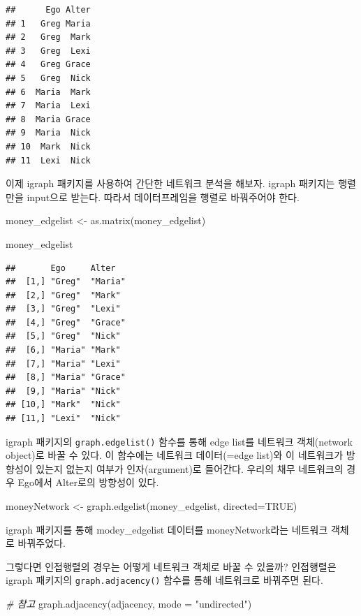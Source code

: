 \documentclass[
]{book}
\newenvironment{Shaded}{\begin{snugshade}}{\end{snugshade}}
\newcommand{\AttributeTok}[1]{\textcolor[rgb]{0.77,0.63,0.00}{#1}}
\newcommand{\CommentTok}[1]{\textcolor[rgb]{0.56,0.35,0.01}{\textit{#1}}}
\newcommand{\ConstantTok}[1]{\textcolor[rgb]{0.00,0.00,0.00}{#1}}
\newcommand{\FunctionTok}[1]{\textcolor[rgb]{0.00,0.00,0.00}{#1}}
\newcommand{\NormalTok}[1]{#1}
\newcommand{\OtherTok}[1]{\textcolor[rgb]{0.56,0.35,0.01}{#1}}
\newcommand{\StringTok}[1]{\textcolor[rgb]{0.31,0.60,0.02}{#1}}
\begin{document}
\begin{verbatim}
##      Ego Alter
## 1   Greg Maria
## 2   Greg  Mark
## 3   Greg  Lexi
## 4   Greg Grace
## 5   Greg  Nick
## 6  Maria  Mark
## 7  Maria  Lexi
## 8  Maria Grace
## 9  Maria  Nick
## 10  Mark  Nick
## 11  Lexi  Nick
\end{verbatim}

이제 igraph 패키지를 사용하여 간단한 네트워크 분석을 해보자. igraph 패키지는 행렬만을 input으로 받는다. 따라서 데이터프레임을 행렬로 바꿔주어야 한다.

\begin{Shaded}
\begin{Highlighting}[]
\NormalTok{money\_edgelist }\OtherTok{\textless{}{-}} \FunctionTok{as.matrix}\NormalTok{(money\_edgelist)}

\NormalTok{money\_edgelist}
\end{Highlighting}
\end{Shaded}

\begin{verbatim}
##       Ego     Alter  
##  [1,] "Greg"  "Maria"
##  [2,] "Greg"  "Mark" 
##  [3,] "Greg"  "Lexi" 
##  [4,] "Greg"  "Grace"
##  [5,] "Greg"  "Nick" 
##  [6,] "Maria" "Mark" 
##  [7,] "Maria" "Lexi" 
##  [8,] "Maria" "Grace"
##  [9,] "Maria" "Nick" 
## [10,] "Mark"  "Nick" 
## [11,] "Lexi"  "Nick"
\end{verbatim}

igraph 패키지의 \texttt{graph.edgelist()} 함수를 통해 edge list를 네트워크 객체(network object)로 바꿀 수 있다. 이 함수에는 네트워크 데이터(=edge list)와 이 네트워크가 방향성이 있는지 없는지 여부가 인자(argument)로 들어간다. 우리의 채무 네트워크의 경우 Ego에서 Alter로의 방향성이 있다.

\begin{Shaded}
\begin{Highlighting}[]
\NormalTok{  moneyNetwork }\OtherTok{\textless{}{-}} \FunctionTok{graph.edgelist}\NormalTok{(money\_edgelist, }\AttributeTok{directed=}\ConstantTok{TRUE}\NormalTok{)}
\end{Highlighting}
\end{Shaded}

igraph 패키지를 통해 modey\_edgelist 데이터를 moneyNetwork라는 네트워크 객체로 바꿔주었다.

그렇다면 인접행렬의 경우는 어떻게 네트워크 객체로 바꿀 수 있을까? 인접행렬은 igraph 패키지의 \texttt{graph.adjacency()} 함수를 통해 네트워크로 바꿔주면 된다.

\begin{Shaded}
\begin{Highlighting}[]
  \CommentTok{\# 참고 }
  \FunctionTok{graph.adjacency}\NormalTok{(adjacency, }\AttributeTok{mode =} \StringTok{"undirected"}\NormalTok{)}
\end{Highlighting}
\end{Shaded}
\end{document}
